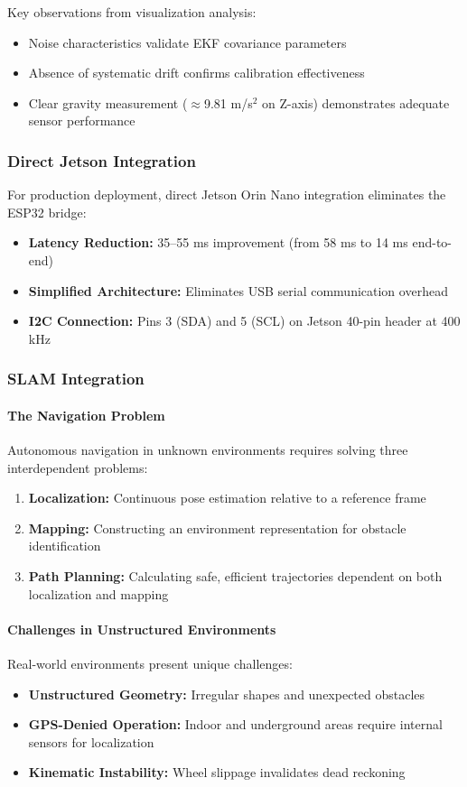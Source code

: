 Key observations from visualization analysis:
\begin{itemize}
    \item Noise characteristics validate EKF covariance parameters
    \item Absence of systematic drift confirms calibration effectiveness
    \item Clear gravity measurement ($\approx$9.81 m/s$^2$ on Z-axis) demonstrates adequate sensor performance
\end{itemize}

\subsubsection{Direct Jetson Integration}

For production deployment, direct Jetson Orin Nano integration eliminates the ESP32 bridge:
\begin{itemize}
    \item \textbf{Latency Reduction:} 35--55 ms improvement (from 58 ms to 14 ms end-to-end)
    \item \textbf{Simplified Architecture:} Eliminates USB serial communication overhead
    \item \textbf{I2C Connection:} Pins 3 (SDA) and 5 (SCL) on Jetson 40-pin header at 400 kHz
\end{itemize}

\subsubsection{SLAM Integration}

\paragraph{The Navigation Problem}
Autonomous navigation in unknown environments requires solving three interdependent problems:
\begin{enumerate}
    \item \textbf{Localization:} Continuous pose estimation relative to a reference frame
    \item \textbf{Mapping:} Constructing an environment representation for obstacle identification
    \item \textbf{Path Planning:} Calculating safe, efficient trajectories dependent on both localization and mapping
\end{enumerate}

\paragraph{Challenges in Unstructured Environments}
Real-world environments present unique challenges:
\begin{itemize}
    \item \textbf{Unstructured Geometry:} Irregular shapes and unexpected obstacles
    \item \textbf{GPS-Denied Operation:} Indoor and underground areas require internal sensors for localization
    \item \textbf{Kinematic Instability:} Wheel slippage invalidates dead reckoning
\end{itemize}

